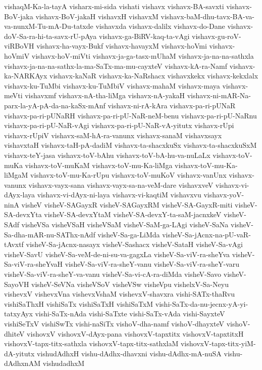 {vishaqM-Ka-la-tayA
visharx-mi-sida
vishati
vishavx
vishavx-BA-savxti
vishavx-BoV-jaka
vishavx-BoV-jakaH
vishavxH
vishavxM
vishavx-baM-dhu-tavx-BA-va-va-nunxM-Tu-mA-Du-tatxde
vishavxda
vishavx-dalilx
vishavx-do-Dane
vishavx-doV-Sa-ra-hi-ta-savx-rU-pAya
vishavx-ga-BiRV-kaq-ta-vAgi
vishavx-gu-roV-viRBoVH
vishavx-ha-vayx-Bukf
vishavx-havayxM
vishavx-hoVmi
vishavx-hoVmiV
vishavx-hoV-miVti
vishavx-ja-ga-tasx-mUhaM
vishavx-ja-na-na-sathxla
vishavx-ja-na-na-sathx-la-ma-SaTx-ma-mu-cayxteV
vishavx-kA-ra-Namf
vishavx-ka-NARKAyx
vishavx-kaNaR
vishavx-ka-NaRshacx
vishavxkekx
vishavx-kekxlalx
vishavx-ku-TuMbi
vishavx-ku-TuMbiV
vishavx-mahaM
vishavx-maya
vishavx-meVti
vishavxmf
vishavx-nA-tha-liMga
vishavx-nA-yakaH
vishavx-ni-mAR-Na-parx-la-yA-pA-da-na-kaSx-mAnf
vishavx-ni-rA-kAra
vishavx-pa-ri-pUNaR
vishavx-pa-ri-pUNaRH
vishavx-pa-ri-pU-NaR-neM-benu
vishavx-pa-ri-pU-NaRnu
vishavx-pa-ri-pU-NaR-vAgi
vishavx-pa-ri-pU-NaR-vA-yitutx
vishavx-rUpi
vishavx-rUpiV
vishavx-saM-hA-ra-vanunx
vishavx-sanaM
vishavxsayx
vishavxtaH
vishavx-taH-pA-dadiM
vishavx-ta-shacxkuSx
vishavx-ta-shacxkuSxM
vishavx-teY-jasa
vishavx-toV-bAhu
vishavx-toV-bA-hu-va-nuLaLx
vishavx-toV-muKa
vishavx-toV-muKaM
vishavx-toV-mu-Ka-liMga
vishavx-toV-mu-Ka-liMgaM
vishavx-toV-mu-Ka-rUpu
vishavx-toV-muKoV
vishavx-vanUnx
vishavx-vanunx
vishavx-vayx-sana
vishavx-vayx-sa-na-veM-dare
vishavxveV
vishavx-vi-dAyx-laya
vishavx-vi-dAyx-ni-laya
vishavx-vi-kaqtiM
vishavxvu
vishavx-yoV-ninA
visheV
visheV-SAGayxR
visheV-SAGayxRM
visheV-SA-GayxR-miti
visheV-SA-devxYta
visheV-SA-devxYtaM
visheV-SA-devxY-ta-saM-jacnxkeV
visheV-SAdf
visheVSa
visheVSaH
visheVSaM
visheV-SaM-ga-LAgi
visheV-SaNa
visheV-Sa-dha-mAR-nu-SAThx-nAdf
visheV-Sa-ga-LiMda
visheV-Sa-jAcnx-na-pU-vaR-tAvxtf
visheV-Sa-jAcnx-nasayx
visheV-Sashacx
visheV-SataH
visheV-Sa-vAgi
visheV-SavU
visheV-Sa-veM-de-ni-su-va-gagxLa
visheV-Sa-viV-ra-sheYva
visheV-Sa-viV-ra-sheYvaH
visheV-Sa-viV-ra-sheY-vanu
visheV-Sa-viV-ra-sheY-varu
visheV-Sa-viV-ra-sheY-va-vanu
visheV-Sa-vi-cA-ra-diMda
visheV-Savo
visheV-SayoVH
visheV-SeVNa
visheVSoV
visheVSw
visheVpu
vishelxV-Sa-Neyu
vishevxV
vishevxVna
vishevxVshaM
vishevxV-shavxra
vishi-SATx-thaRvu
vishiSaThxH
vishiSaTx
vishiSaTxH
vishiSaTxM
vishi-SaTx-da-nu-jecnx-yA-yi-tatxyAyx
vishi-SaTx-nAda
vishi-SaTxte
vishi-SaTx-vAda
vishi-SayxteV
vishiSeTxV
vishiSwTx
vishi-naSiTx
vishoV-dha-namf
vishoV-dhayxteV
vishoV-dhiteV
vishovxV
vishovxV-dAyx-pana
vishovxV-tapxtitx
vishovxV-tapxtitxH
vishovxV-tapx-titx-sathxla
vishovxV-tapx-titx-sathxlaM
vishovxV-tapx-titx-yiM-dA-yitutx
vishudAdhxH
vishu-dAdhx-dhavxni
vishu-dAdhx-mA-nuSA
vishu-dAdhxnAM
vishudadhxM
}
